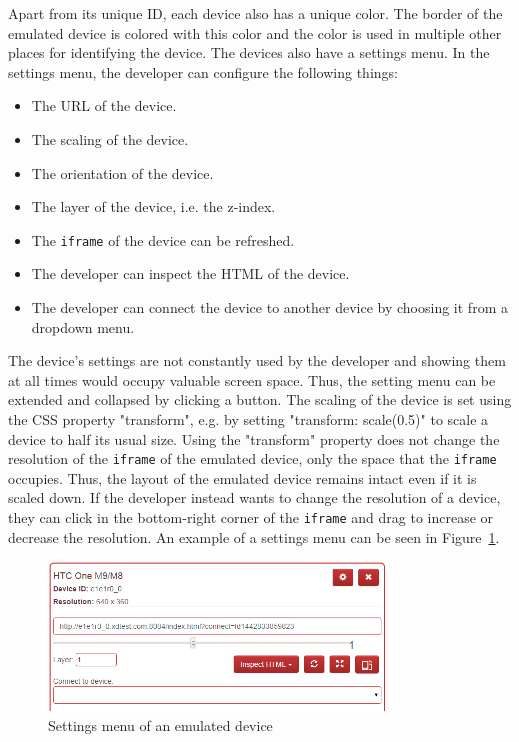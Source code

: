 Apart from its unique ID, each device also has a unique color. The border of the emulated device is colored with this color and the color is used in multiple other places for identifying the device. The devices also have a settings menu. In the settings menu, the developer can configure the following things:
\begin{itemize}
	\item The URL of the device.
	\item The scaling of the device.
	\item The orientation of the device.
	\item The layer of the device, i.e. the z-index. 
	\item The \lstinline|iframe| of the device can be refreshed.
	\item The developer can inspect the HTML of the device.
	\item The developer can connect the device to another device by choosing it from a dropdown menu.
\end{itemize}
The device's settings are not constantly used by the developer and showing them at all times would occupy valuable screen space. Thus, the setting menu can be extended and collapsed by clicking a button. The scaling of the device is set using the CSS property "transform", e.g. by setting "transform: scale(0.5)" to scale a device to half its usual size. Using the "transform" property does not change the resolution of the \lstinline|iframe| of the emulated device, only the space that the \lstinline|iframe| occupies. Thus, the layout of the emulated device remains intact even if it is scaled down. If the developer instead wants to change the resolution of a device, they can click in the bottom-right corner of the \lstinline|iframe| and drag to increase or decrease the resolution. An example of a settings menu can be seen in Figure~\ref{fig:settings_menu}. 

\begin{figure}[H]
  \centering
    \includegraphics[width=0.8\textwidth]{images/screenshots/settings_menu_2.png}
	\caption[Screenshot: Settings menu emulated device]{Settings menu of an emulated device}
	\label{fig:settings_menu}
\end{figure}


